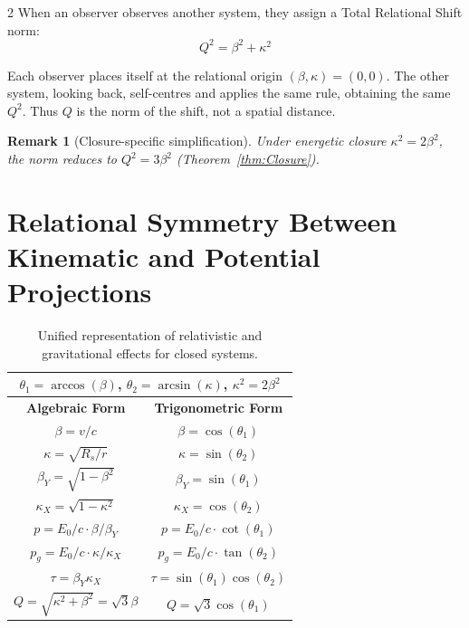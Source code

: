 \documentclass[10pt, a4paper]{article}
\newtheorem{remark}[theorem]{Remark}
\begin{document}
\begin{multicols}{2}
\hypertarget{eq:Q-definition}{}\label{eq:Q-definition}
When an observer observes another system, they assign a Total Relational Shift norm:
\begin{equation}
\boxed{Q^2=\beta^2+\kappa^2}
\end{equation}

Each observer places itself at the relational origin $(\beta,\kappa)=(0,0)$. The other system, looking back, self-centres and applies the same rule, obtaining the same $Q^2$. Thus $Q$ is the norm of the shift, not a spatial distance.

\begin{remark}[Closure-specific simplification]
Under energetic closure $\kappa^{2}=2\beta^{2}$, the norm reduces to $Q^{2}=3\beta^{2}$ (Theorem~\ref{thm:Closure}).
\end{remark}



\section{Relational Symmetry Between Kinematic and Potential Projections}
\hypertarget{projections_symmetry}{}\label{projections_symmetry}

\begin{table}[h]
\centering\footnotesize
\begin{tabular}{|c|c|}\hline
\multicolumn{2}{|c|}{$\theta_1= \arccos(\beta)$, $\theta_2 = \arcsin(\kappa)$, $\kappa^2 = 2\beta^2$}\\
\hline
\textbf{Algebraic Form} & \textbf{Trigonometric Form} \\\hline
$\beta=v/c$&$\beta=\cos(\theta_1)$\\\hline
$\kappa=\sqrt{R_s/r}$&$\kappa=\sin(\theta_2)$\\\hline
$\beta_Y = \sqrt{1-\beta^2}$& $\beta_Y = \sin(\theta_1)$\\\hline
$\kappa_X = \sqrt{1-\kappa^2}$&$\kappa_X = \cos(\theta_2)$\\\hline
$p=E_0/c \cdot \beta/\beta_Y$&$p=E_0/c \cdot \cot(\theta_1)$\\\hline
$p_g=E_0/c \cdot \kappa/\kappa_X$&$p_g=E_0/c \cdot \tan(\theta_2)$\\\hline
$\tau = \beta_Y\kappa_X$&$\tau = \sin(\theta_1) \cos(\theta_2)$\\\hline
$Q =\sqrt{\kappa^2 + \beta^2}=\sqrt{3}\beta$&$Q = \sqrt{3} \cos(\theta_1)$\\\hline
\end{tabular}
\caption{Unified representation of relativistic and gravitational effects for closed systems.}
\end{table}



\end{multicols}
\end{document}
